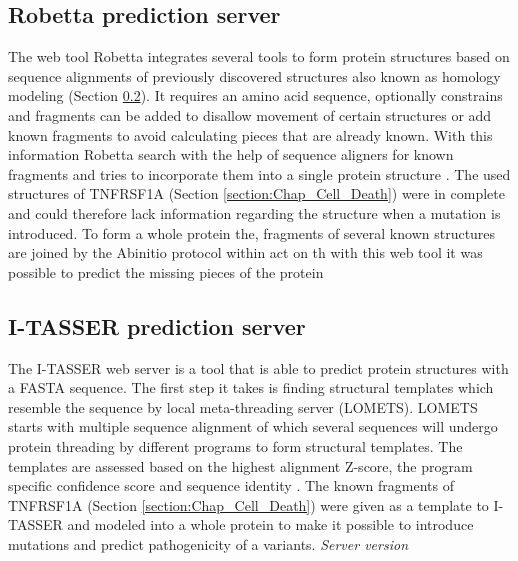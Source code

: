 \subsection{Robetta prediction server}
The web tool Robetta integrates several tools to form protein structures based on sequence alignments of previously discovered structures also known as homology modeling (Section \ref{}). It requires an amino acid sequence, optionally constrains and fragments can be added to disallow movement of certain structures or add known fragments to avoid calculating pieces that are already known. With this information Robetta search with the help of sequence aligners for known fragments and tries to incorporate them into a single protein structure \cite{}.
The used structures of TNFRSF1A (Section \ref{section:Chap_Cell_Death}) were in complete and could therefore lack information regarding the structure when a mutation is introduced. To form a whole protein the, fragments of several known structures are joined by the Abinitio protocol within act on th with this web tool it was possible to predict the missing pieces of the protein
\label{subsubsec:MM_Robetta}

\subsection{I-TASSER prediction server}
The I-TASSER web server is a tool that is able to predict protein structures with a FASTA sequence. The first step it takes is finding structural templates which resemble the sequence by local meta-threading server (LOMETS). LOMETS starts with multiple sequence alignment of which several sequences will undergo protein threading by different programs to form structural templates. The templates are assessed based on the highest alignment Z-score, the program specific confidence score and sequence identity \cite{}.
The known fragments of TNFRSF1A (Section \ref{section:Chap_Cell_Death}) were given as a template to I-TASSER and modeled into a whole protein to make it possible to introduce mutations and predict pathogenicity of a variants.
\label{subsec:MM_I_TASSER}
\newline
\textit{Server version}

